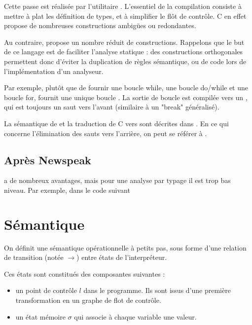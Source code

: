 \documentclass{phdthesis}
\begin{document}
Cette passe est réalisée par l'utilitaire \ctonewspeak{}. L'essentiel de la
compilation consiste à mettre à plat les définition de types, et à simplifier le
flôt de contrôle. C en effet propose de nombreuses constructions ambigües ou
redondantes.

\begin{minipage}{0.5\textwidth}

\end{minipage}
\begin{minipage}{0.5\textwidth}

\end{minipage}

Au contraire, \newspeak{} propose un nombre réduit de constructions. Rappelons
que le but de ce langage est de faciliter l'analyse statique : des constructions
orthogonales permettent donc d'éviter la duplication de règles sémantique, ou de
code lors de l'implémentation d'un analyseur.

Par exemple, plutôt que de fournir une boucle while, une boucle do/while et une
boucle for, \newspeak{} fournit une unique boucle \npkWhile{}. La sortie de
boucle est compilée vers un \npkGoto{}, qui est toujours un saut vers l'avant
(similaire à un "break" généralisé).

La sémantique de \newspeak{} et la traduction de C vers \newspeak{} sont
décrites dans \cite{npkSem}. En ce qui concerne l'élimination des sauts vers
l'arrière, on peut se référer à \cite{goto}.

\subsection{Après Newspeak}

\newspeak{} a de nombreux avantages, mais pour une analyse par typage il est
trop bas niveau. Par exemple, dans le code suivant



\section{Sémantique}

On définit une sémantique opérationnelle à petits pas, sous forme d'une relation
de transition (notée $→$) entre états de l'interpréteur.

Ces états sont constitués des composantes suivantes :

\begin{itemize}
\item
  un point de contrôle $l$ dans le programme. Ils sont issus d'une
  première transformation en un graphe de flot de contrôle.
\item
  un état mémoire $σ$ qui associe à chaque variable une valeur.
\end{itemize}
\end{document}
